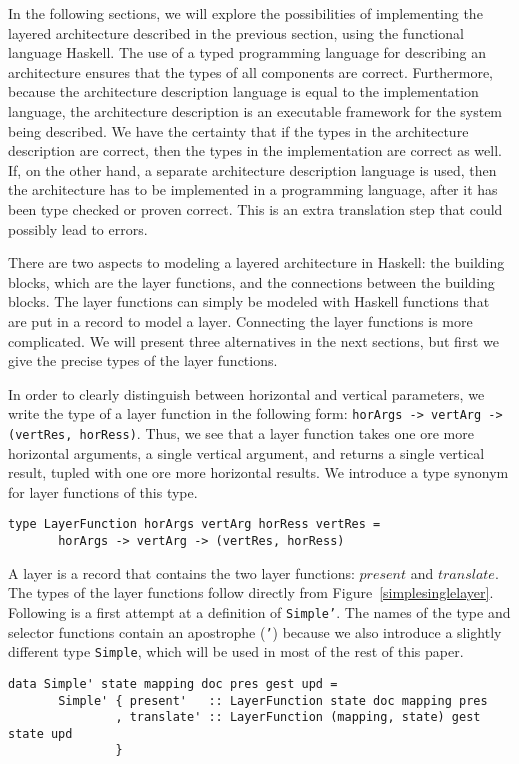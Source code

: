 \par In the following sections, we will explore the possibilities of
      implementing the layered architecture described in the previous section, using
      the functional language Haskell. The use of a typed programming language for
      describing an architecture ensures that the types of all components are
      correct. Furthermore, because the architecture description language is equal to
      the implementation language, the architecture description is an executable
      framework for the system being described. We have the certainty that if the
      types in the architecture description are correct, then the types in the
      implementation are correct as well. If, on the other hand, a separate
      architecture description language is used, then the architecture has to be
      implemented in a programming language, after it has been type checked or proven
      correct. This is an extra translation step that could possibly lead to
      errors.
\par There are two aspects to modeling a layered architecture in Haskell: the
      building blocks, which are the layer functions, and the connections between the
      building blocks. The layer functions can simply be modeled with Haskell
      functions that are put in a record to model a layer. Connecting the layer
      functions is more complicated. We will present three alternatives in the next
      sections, but first we give the precise types of the layer functions. 
\par In order to clearly distinguish between horizontal and vertical
      parameters, we write the type of a layer function in the following form:
      \texttt{horArgs -> vertArg -> (vertRes, horRess)}. Thus, we see that a
      layer function takes one ore more horizontal arguments, a single vertical
      argument, and returns a single vertical result, tupled with one ore more
      horizontal results. We introduce a type synonym for layer functions of this
      type.\begin{small}\begin{verbatim}type LayerFunction horArgs vertArg horRess vertRes =
       horArgs -> vertArg -> (vertRes, horRess)\end{verbatim}\end{small}

\par A layer is a record that contains the two layer functions: $present$ and
      $translate$. The types of the layer functions follow directly from
      Figure~\ref{simplesinglelayer}. Following is a first attempt at
      a definition of \texttt{Simple'}. The names of the type and selector functions
      contain an apostrophe (\texttt{'}) because we also introduce a slightly
      different type \texttt{Simple}, which will be used in most of the rest of this
      paper.\begin{small}\begin{verbatim}data Simple' state mapping doc pres gest upd =
       Simple' { present'   :: LayerFunction state doc mapping pres
               , translate' :: LayerFunction (mapping, state) gest state upd
               }\end{verbatim}\end{small}

